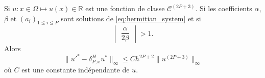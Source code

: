 \begin{theoreme}
Si $u : x \in \Omega \mapsto u(x) \in \mathbb{R}$ est une fonction de classe $\mathcal{C}^{(2P+3)}$.
Si les coefficients $\alpha$, $\beta$ et $(a_i)_{1 \leq i \leq P}$ sont solutions de \eqref{eq:hermitian_system} et si 
\begin{equation}
\begin{vmatrix}
\dfrac{\alpha}{2 \beta}
\end{vmatrix} > 1.
\end{equation}
Alors 
\begin{equation}
\| u'^* - \delta_{P,x}^H u^* \|_{\infty} \leq C h^{2P+2} \| u^{(2P+3)} \|_{\infty}
\end{equation}
où $C$ est une constante indépendante de $u$.
\end{theoreme}

